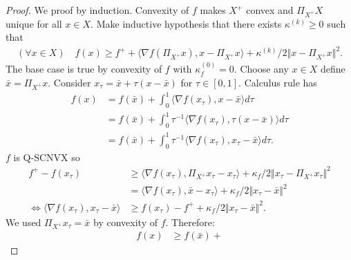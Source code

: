 \documentclass[12pt]{report}
\begin{document}
            \begin{proof}
                We proof by induction. 
                Convexity of $f$ makes $X^+$ convex and $\Pi_{X^+}X$ unique for all $x \in X$. 
                Make inductive hypothesis that there exists $\kappa^{(k)} \ge 0$ such that 
                \begin{align*}
                    (\forall x \in X)\quad
                    f(x) \ge f^+ + \langle \nabla f(\Pi_{X^+}x), x - \Pi_{X^+}x\rangle 
                    + \kappa^{(k)}/2\Vert x - \Pi_{X^+}x \Vert^2. 
                \end{align*}
                The base case is true by convexity of $f$ with $\kappa_f^{(0)} = 0$. 
                Choose any $x \in X$ define $\bar x = \Pi_{X^+}x$. 
                Consider $x_\tau = \bar x + \tau(x - \bar x)$ for $\tau \in [0, 1]$. 
                Calculus rule has 
                \begin{align*}
                    f(x) &= 
                    f(\bar x) + \int_0^1 \langle \nabla f(x_\tau), x - \bar x\rangle d\tau
                    \\
                    &= 
                    f(\bar x) + \int_0^1 \tau^{-1}\langle \nabla f(x_\tau), \tau(x - \bar x)\rangle d\tau
                    \\
                    &= 
                    f(\bar x) + \int_0^1 \tau^{-1}\langle \nabla f(x_\tau), x_\tau - \bar x\rangle d\tau.
                \end{align*}
                $f$ is Q-SCNVX so
                \begin{align*}
                    f^+ - f(x_\tau) &\ge \langle \nabla f(x_\tau), \Pi_{X^+}x_\tau - x_\tau\rangle + 
                    \kappa_f/2 \Vert x_\tau - \Pi_{X^+}x_\tau\Vert^2
                    \\
                    &= 
                    \langle \nabla f(x_\tau), \bar x - x_\tau\rangle + 
                    \kappa_f/2 \Vert x_\tau - \bar x\Vert^2
                    \\
                    \iff 
                    \langle \nabla f(x_\tau), x_\tau - \bar x\rangle
                    &\ge f(x_\tau) - f^+ + \kappa_f/2\Vert x_\tau -\bar x\Vert^2. 
                \end{align*}
                We used $\Pi_{X^+}x_\tau = \bar x$ by convexity of $f$. 
                Therefore:
                {\footnotesize
                \begin{align*}
                    f(x) &\ge 
                    f(\bar x) + 

\end{align*}}
\end{proof}
\end{document}
